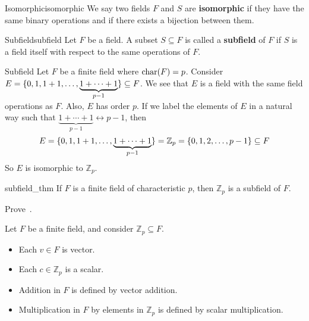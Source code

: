 
\begin{Definition}{Isomorphic}{isomorphic}
    We say two fields $F$ and $S$ are \textbf{isomorphic} if they have the same
    binary operations and if there exists a bijection between them.
\end{Definition}

\begin{Definition}{Subfield}{subfield}
    Let $ F $ be a field. A subset $ S\subseteq F $ is called a \textbf{subfield}
    of $ F $ if $ S $ is a field itself with respect to the same operations
    of $ F $.
\end{Definition}

\begin{Example}{Subfield}{}
    Let $ F $ be a finite field where $ \operatorname{char}(F)=p $. Consider
    $ E=\{0,1,1+1,\ldots,\underbrace{1+\cdots+1}_{p-1}\}\subseteq F $.
    We see that $ E $ is a field with the same field operations as $ F $.
    Also, $ E $ has order $ p $. If we label the elements of $ E $
    in a natural way such that $ \underbrace{1+\cdots+1}_{p-1}
        \longleftrightarrow p-1 $,
    then
    \[ E=\{0,1,1+1,\ldots,\underbrace{1+\cdots+1}_{p-1}\}
        = \mathbb{Z}_p= \{0,1,2,\ldots ,p-1\}\subseteq F \]
    So $ E $ is isomorphic to $ \mathbb{Z}_p $.
\end{Example}

\begin{Theorem}{}{subfield_thm}
    If $ F $ is a finite field of characteristic $ p $, then
    $ \mathbb{Z}_p $ is a subfield of $ F $.
\end{Theorem}

\begin{Exercise}{}{}
    Prove~.
\end{Exercise}

\begin{Definition}{}{}
    Let $ F $ be a finite field, and consider $ \mathbb{Z}_p\subseteq F $.
    \begin{itemize}
        \item Each $ v\in F $ is vector.
        \item Each $ c\in\mathbb{Z}_p $ is a scalar.
        \item Addition in $ F $ is defined by vector addition.
        \item Multiplication in $ F $ by elements in $ \mathbb{Z}_p $
              is defined by scalar multiplication.
    \end{itemize}
\end{Definition}


